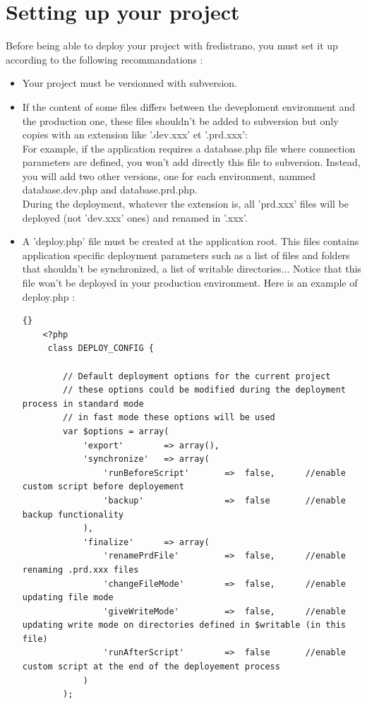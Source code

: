 \documentclass[12pt,a4paper]{report}
\begin{document}
\section{Setting up your project}\label{precimportantes}
Before being able to deploy your project with fredistrano, you must set it up according to the following recommandations :\\
\begin{itemize}
\item Your project must be versionned with subversion.\\
\item If the content of some files differs between the deveploment environment and the production one, these files shouldn't be added to subversion but only copies with an extension like '.dev.xxx' et '.prd.xxx':\\
For example, if the application requires a database.php file where connection parameters are defined, you won't add directly this file to subversion. Instead, you will add two other versions, one for each environment, nammed database.dev.php and database.prd.php.\\ 
During the deployment, whatever the extension is, all 'prd.xxx' files will be deployed (not 'dev.xxx' ones) and renamed in '.xxx'.
\item A 'deploy.php' file must be created at the application root. This files contains application specific deployment parameters such as a list of files and folders that shouldn't be synchronized, a list of writable directories... Notice that this file won't be deployed in your production environment. Here is an example of deploy.php :\\

\lstset{language=Php}
\lstset{breaklines=true}
\lstset{tabsize=2}
\lstset{commentstyle=\textit}
\begin{lstlisting}[frame=tb]{}
	<?php
	 class DEPLOY_CONFIG {

		// Default deployment options for the current project
		// these options could be modified during the deployment process in standard mode
		// in fast mode these options will be used
	 	var $options = array(
	 		'export' 		=> array(),
	 		'synchronize'	=> array(
	 		 	'runBeforeScript'		=> 	false, 		//enable custom script before deployement 
	 			'backup'				=> 	false 		//enable backup functionality
	 		),
	 		'finalize'		=> array(
		 		'renamePrdFile' 		=> 	false,		//enable renaming .prd.xxx files
				'changeFileMode' 		=> 	false,		//enable updating file mode
				'giveWriteMode'			=> 	false,		//enable updating write mode on directories defined in $writable (in this file)
	 			'runAfterScript'		=> 	false		//enable custom script at the end of the deployement process
	 		)
	 	);


\end{lstlisting}
\end{itemize}
\end{document}
